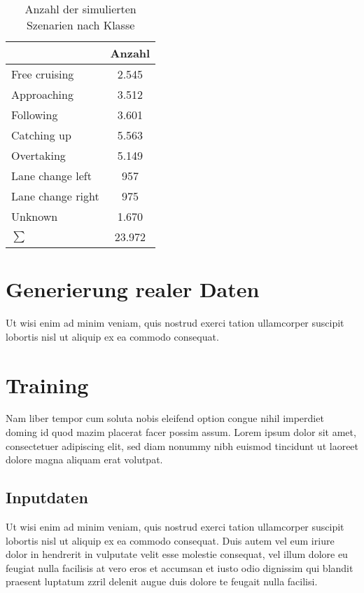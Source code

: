 \begin{table}[h]
\small
\centering
\def\arraystretch{1.4}
\begin{tabular}{l c}
\textbf{Szenario) & \textbf{Anzahl} \\
\hline
Free cruising & 2.545 \\
Approaching & 3.512 \\
Following & 3.601 \\
Catching up & 5.563 \\
Overtaking & 5.149 \\
Lane change left & 957 \\
Lane change right & 975 \\
Unknown & 1.670 \\
\hline
$\sum$ & 23.972 \\
\hline
\end{tabular}
\caption{Anzahl der simulierten Szenarien nach Klasse}
\label{tab_verteilung_szenarien}
\end{table}





\section{Generierung realer Daten}
\label{umsetzung_daten_real}

Ut wisi enim ad minim veniam, quis nostrud exerci tation ullamcorper suscipit lobortis nisl ut aliquip ex ea commodo consequat.


\section{Training}
\label{umsetzung_training}

Nam liber tempor cum soluta nobis eleifend option congue nihil imperdiet doming id quod mazim placerat facer possim assum. Lorem ipsum dolor sit amet, consectetuer adipiscing elit, sed diam nonummy nibh euismod tincidunt ut laoreet dolore magna aliquam erat volutpat.


\subsection{Inputdaten}
\label{umsetzung_training_input}

Ut wisi enim ad minim veniam, quis nostrud exerci tation ullamcorper suscipit lobortis nisl ut aliquip ex ea commodo consequat. Duis autem vel eum iriure dolor in hendrerit in vulputate velit esse molestie consequat, vel illum dolore eu feugiat nulla facilisis at vero eros et accumsan et iusto odio dignissim qui blandit praesent luptatum zzril delenit augue duis dolore te feugait nulla facilisi.


